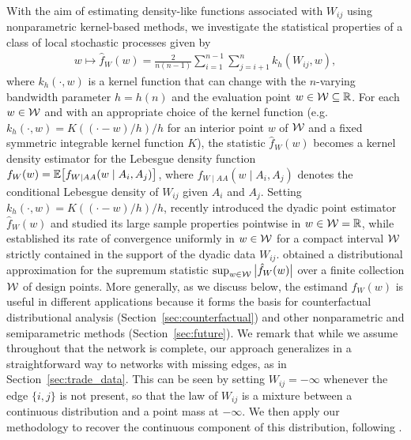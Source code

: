 With the aim of estimating density-like functions associated with $W_{i j}$
using nonparametric kernel-based methods, we investigate the statistical
properties of a class of local stochastic processes given by
%
\begin{align}\label{eq:kernel_estimator}
  w \mapsto \hat{f}_W(w)
  = \frac{2}{n(n-1)} \sum_{i=1}^{n-1} \sum_{j=i+1}^n k_h(W_{i j},w),
\end{align}
%
where $k_h(\cdot,w)$ is a kernel function that can change with the $n$-varying
bandwidth parameter $h=h(n)$ and the evaluation point $w \in \mathcal{W}\subseteq \mathbb{R}$.
For each $w\in\mathcal{W}$ and with an appropriate choice of the kernel function
(e.g.\ $k_h(\cdot,w)=K((\cdot-w)/h)/h$ for an interior point $w$ of $\mathcal{W}$ and a
fixed symmetric integrable kernel function $K$), the statistic $\hat{f}_W(w)$
becomes a kernel density estimator for the Lebesgue density function
$f_W(w) = \mathbb{E}\big[f_{W \mid AA}(w \mid A_i,A_j)\big]$, where
$f_{W \mid AA}(w \mid A_i,A_j)$ denotes the conditional Lebesgue density of
$W_{i j}$ given $A_i$ and $A_j$. Setting $k_h(\cdot,w)=K((\cdot-w)/h)/h$,
\citet{graham2022kernel} recently introduced the dyadic point estimator
$\hat{f}_W(w)$ and studied its large sample properties pointwise in
$w\in\mathcal{W}=\mathbb{R}$, while \citet{chiang2020empirical} established its rate of
convergence uniformly in $w\in\mathcal{W}$ for a compact interval $\mathcal{W}$ strictly
contained in the support of the dyadic data $W_{i j}$.
\citet{chiang2022inference} obtained a distributional approximation for the
supremum statistic $\sup_{w\in\mathcal{W}}\big|\hat{f}_W(w)\big|$ over a finite
collection $\mathcal{W}$ of design points. More generally, as we discuss below, the
estimand $f_W(w)$ is useful in different applications because it forms the
basis for counterfactual distributional analysis
(Section~\ref{sec:counterfactual}) and other nonparametric and semiparametric
methods (Section~\ref{sec:future}). We remark that while we assume throughout
that the network is complete, our approach generalizes in a straightforward way
to networks with missing edges, as in Section~\ref{sec:trade_data}. This can be
seen by setting $W_{i j} = -\infty$ whenever the edge $\{i, j\}$ is not
present, so that the law of $W_{i j}$ is a mixture between a continuous
distribution and a point mass at $-\infty$. We then apply our methodology to
recover the continuous component of this distribution, following
\citet{chiang2022inference}.

